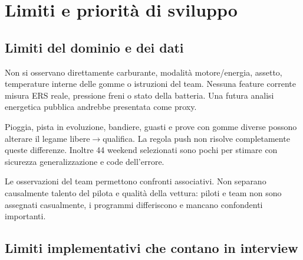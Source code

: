 \documentclass[11pt,a4paper]{article}
\begin{document}
\section{Limiti e priorità di sviluppo}\label{limiti-e-priorituxe0-di-sviluppo}

\subsection{Limiti del dominio e dei dati}\label{limiti-del-dominio-e-dei-dati}

Non si osservano direttamente carburante, modalità motore/energia, assetto, temperature interne delle gomme o istruzioni del team. Nessuna feature corrente misura ERS reale, pressione freni o stato della batteria. Una futura analisi energetica pubblica andrebbe presentata come proxy.

Pioggia, pista in evoluzione, bandiere, guasti e prove con gomme diverse possono alterare il legame libere\ensuremath{\rightarrow}qualifica. La regola push non risolve completamente queste differenze. Inoltre 44 weekend selezionati sono pochi per stimare con sicurezza generalizzazione e code dell'errore.

Le osservazioni del team permettono confronti associativi. Non separano causalmente talento del pilota e qualità della vettura: piloti e team non sono assegnati casualmente, i programmi differiscono e mancano confondenti importanti.

\subsection{Limiti implementativi che contano in interview}\label{limiti-implementativi-che-contano-in-interview}
\end{document}
